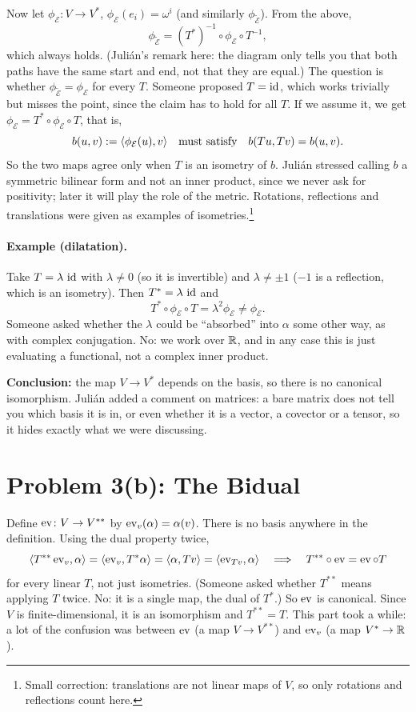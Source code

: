 \documentclass[11pt,a4paper]{article}
\newcommand{\E}{\mathcal{E}}
\newcommand{\Et}{\widetilde{\mathcal{E}}}
\begin{document}
Now let $\phi_\E\colon V\to V^*$, $\phi_\E(e_i)=\omega^i$ (and similarly $\phi_{\Et}$). From the above,
\[
  \phi_{\Et}=(T^*)^{-1}\circ\phi_\E\circ T^{-1},
\]
which always holds. (Juli\'an's remark here: the diagram only tells you that both paths have the same start and end, not that they are equal.) The question is whether $\phi_{\Et}=\phi_\E$ for every $T$. Someone proposed $T=\operatorname{id}$, which works trivially but misses the point, since the claim has to hold for all $T$. If we assume it, we get $\phi_\E=T^*\circ\phi_\E\circ T$, that is,
\[
  b(u,v):=\pair{\phi_\E(u)}{v}\quad\text{must satisfy}\quad b(Tu,Tv)=b(u,v).
\]
So the two maps agree only when $T$ is an isometry of $b$. Juli\'an stressed calling $b$ a symmetric bilinear form and not an inner product, since we never ask for positivity; later it will play the role of the metric. Rotations, reflections and translations were given as examples of isometries.\footnote{Small correction: translations are not linear maps of $V$, so only rotations and reflections count here.}

\paragraph{Example (dilatation).} Take $T=\lambda\,\operatorname{id}$ with $\lambda\neq0$ (so it is invertible) and $\lambda\neq\pm1$ ($-1$ is a reflection, which is an isometry). Then $T^*=\lambda\,\operatorname{id}$ and
\[
  T^*\circ\phi_\E\circ T=\lambda^2\phi_\E\neq\phi_\E .
\]
Someone asked whether the $\lambda$ could be ``absorbed'' into $\alpha$ some other way, as with complex conjugation. No: we work over $\mathbb{R}$, and in any case this is just evaluating a functional, not a complex inner product.

\textbf{Conclusion:} the map $V\to V^*$ depends on the basis, so there is no canonical isomorphism. Juli\'an added a comment on matrices: a bare matrix does not tell you which basis it is in, or even whether it is a vector, a covector or a tensor, so it hides exactly what we were discussing.

\section{Problem 3(b): The Bidual}
\label{sec:problem3b}

Define $\operatorname{ev}\colon V\to V^{**}$ by $\operatorname{ev}_v(\alpha)=\alpha(v)$. There is no basis anywhere in the definition. Using the dual property twice,
\[
  \langle T^{**}\operatorname{ev}_v, \alpha \rangle=\langle \operatorname{ev}_v, T^*\alpha \rangle=\langle \alpha, Tv \rangle=\langle \operatorname{ev}_{Tv}, \alpha \rangle
  \quad\Longrightarrow\quad T^{**}\circ\operatorname{ev}=\operatorname{ev}\circ T
\]
for every linear $T$, not just isometries. (Someone asked whether $T^{**}$ means applying $T$ twice. No: it is a single map, the dual of $T^*$.) So $\operatorname{ev}$ is canonical. Since $V$ is finite-dimensional, it is an isomorphism and $T^{**}=T$. This part took a while: a lot of the confusion was between $\operatorname{ev}$ (a map $V\to V^{**}$) and $\operatorname{ev}_v$ (a map $V^*\to\mathbb{R}$).
\end{document}
